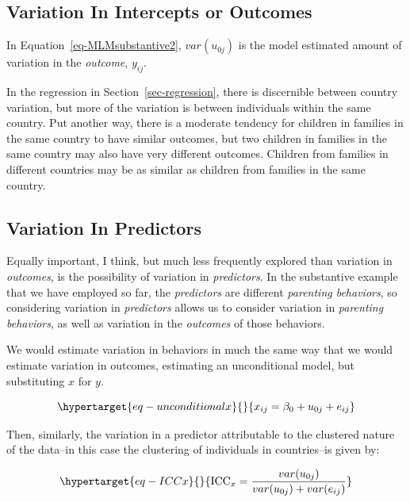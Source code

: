 \documentclass[
  letterpaper,
  DIV=11,
  numbers=noendperiod]{scrreprt}
\begin{document}
\hypertarget{variation-in-intercepts-or-outcomes}{%
\subsection{Variation In Intercepts or
Outcomes}\label{variation-in-intercepts-or-outcomes}}

In Equation~\ref{eq-MLMsubstantive2}, \(var(u_{0j})\) is the model
estimated amount of variation in the \emph{outcome}, \(y_{ij}\).

In the regression in Section~\ref{sec-regression}, there is discernible
between country variation, but more of the variation is between
individuals within the same country. Put another way, there is a
moderate tendency for children in families in the same country to have
similar outcomes, but two children in families in the same country may
also have very different outcomes. Children from families in different
countries may be as similar as children from families in the same
country.

\hypertarget{variation-in-predictors}{%
\subsection{Variation In Predictors}\label{variation-in-predictors}}

Equally important, I think, but much less frequently explored than
variation in \emph{outcomes}, is the possibility of variation in
\emph{predictors}. In the substantive example that we have employed so
far, the \emph{predictors} are different \emph{parenting behaviors}, so
considering variation in \emph{predictors} allows us to consider
variation in \emph{parenting behaviors}, as well as variation in the
\emph{outcomes} of those behaviors.

We would estimate variation in behaviors in much the same way that we
would estimate variation in outcomes, estimating an unconditional model,
but substituting \(x\) for \(y\).

\begin{equation}\protect\hypertarget{eq-unconditionalx}{}{x_{ij} = \beta_0 + u_{0j} + e_{ij}}\label{eq-unconditionalx}\end{equation}

Then, similarly, the variation in a predictor attributable to the
clustered nature of the data--in this case the clustering of individuals
in countries--is given by:

\begin{equation}\protect\hypertarget{eq-ICCx}{}{\text{ICC}_x = \frac{var(u_{0j})}{var(u_{0j}) + var(e_{ij})}}\label{eq-ICCx}\end{equation}
\end{document}
